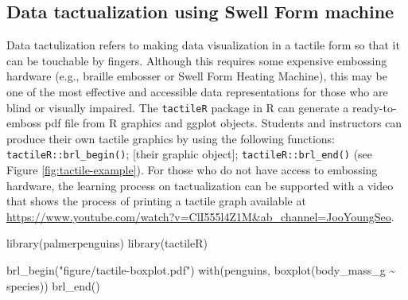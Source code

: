 \documentclass[12pt]{article}
\newenvironment{Shaded}{\begin{snugshade}}{\end{snugshade}}
\newcommand{\FunctionTok}[1]{\textcolor[rgb]{0.00,0.00,0.00}{#1}}
\newcommand{\NormalTok}[1]{#1}
\newcommand{\SpecialCharTok}[1]{\textcolor[rgb]{0.00,0.00,0.00}{#1}}
\newcommand{\StringTok}[1]{\textcolor[rgb]{0.31,0.60,0.02}{#1}}
\begin{document}
\hypertarget{data-tactualization-using-swell-form-machine}{%
\subsection{Data tactualization using Swell Form machine}\label{data-tactualization-using-swell-form-machine}}

Data tactulization refers to making data visualization in a tactile form so that it can be touchable by fingers.
Although this requires some expensive embossing hardware (e.g., braille embosser or Swell Form Heating Machine), this may be one of the most effective and accessible data representations for those who are blind or visually impaired.
The \texttt{tactileR} \citep{R-tactileR} package in R can generate a ready-to-emboss pdf file from R graphics and ggplot objects.
Students and instructors can produce their own tactile graphics by using the following functions: \texttt{tactileR::brl\_begin()}; {[}their graphic object{]}; \texttt{tactileR::brl\_end()} (see Figure \ref{fig:tactile-example}).
For those who do not have access to embossing hardware, the learning process on tactualization can be supported with a video that shows the process of printing a tactile graph available at \url{https://www.youtube.com/watch?v=ClI555l4Z1M&ab_channel=JooYoungSeo}.

\begin{Shaded}
\begin{Highlighting}[]
\FunctionTok{library}\NormalTok{(palmerpenguins)}
\FunctionTok{library}\NormalTok{(tactileR)}

\FunctionTok{brl\_begin}\NormalTok{(}\StringTok{"figure/tactile{-}boxplot.pdf"}\NormalTok{)}
\FunctionTok{with}\NormalTok{(penguins, }\FunctionTok{boxplot}\NormalTok{(body\_mass\_g }\SpecialCharTok{\textasciitilde{}}\NormalTok{ species))}
\FunctionTok{brl\_end}\NormalTok{()}
\end{Highlighting}
\end{Shaded}
\end{document}
